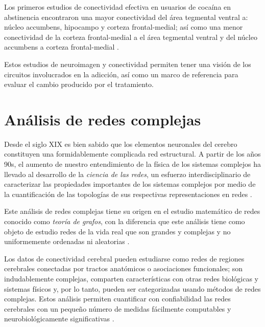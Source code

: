 Los primeros estudios de conectividad efectiva en usuarios de cocaína en abstinencia encontraron una mayor conectividad del área tegmental ventral a: núcleo accumbens, hipocampo y corteza frontal-medial; así como una menor conectividad de la corteza frontal-medial a el área tegmental ventral y del núcleo accumbens a corteza frontal-medial  \parencite{Ray2017,Ray2016}.\par
Estos estudios de neuroimagen y conectividad permiten tener una visión de los circuitos involucrados en la adicción, así como un marco de referencia para evaluar el cambio producido por el tratamiento.

\section{Análisis de redes complejas}
Desde el siglo XIX es bien sabido que los elementos neuronales del cerebro constituyen una formidablemente complicada red estructural.
A partir de los años 90s, el aumento de nuestro entendimiento de la física de los sistemas complejos ha llevado al desarrollo de la \emph{ciencia de las redes}, un esfuerzo interdisciplinario de caracterizar las propiedades importantes de los sistemas complejos por medio de la cuantificación de las topologías de sus respectivas representaciones en redes \parencite{Bullmore2009a,Rubinov2010}.\par
Este análisis de redes complejas tiene su origen en el estudio matemático de redes conocido como \emph{teoría de grafos}, con la diferencia que este análisis tiene como objeto de estudio redes de la vida real que son grandes y complejas y no uniformemente ordenadas ni aleatorias \parencite{Rubinov2010}.\par
Los datos de conectividad cerebral pueden estudiarse como redes de regiones cerebrales conectadas por tractos anatómicos o asociaciones funcionales;
son indudablemente complejas, comparten características con otras redes biológicas y sistemas físicos y, por lo tanto, pueden ser categorizadas usando métodos de redes complejas.
Estos análisis permiten cuantificar con confiabilidad las redes cerebrales con un pequeño número de medidas fácilmente computables y neurobiológicamente significativas \parencite{Humphries2008,Latora2001,Achard2007}. \par

